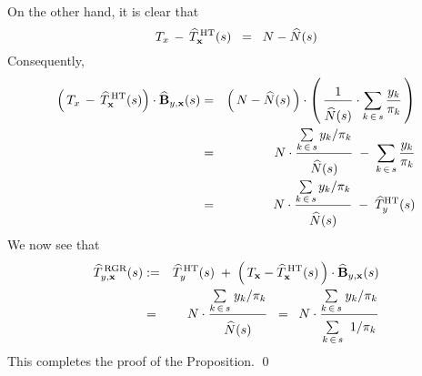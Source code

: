 On the other hand, it is clear that
\begin{equation*}
T_{x} \,-\, \widehat{T}^{\,\textnormal{HT}}_{\mathbf{x}}(s) \;\; = \;\; N - \widehat{N}(s)
\end{equation*}
Consequently,
\begin{eqnarray*}
\left(\,T_{x} \,-\, \widehat{T}^{\,\textnormal{HT}}_{\mathbf{x}}(s)\right)
\cdot
\widehat{\mathbf{B}}_{y,\mathbf{x}}(s)
& = &
	\left(\,N - \widehat{N}(s) \,\right)
	\cdot
	\left(\,
		\dfrac{1}{\overset{{\color{white}.}}{\widehat{N}(s)}}
		\cdot
		\underset{k\,\in\,s}{\sum}\, \dfrac{y_{k}}{\pi_{k}}
	\,\right)
\\
& = &
	N \cdot \dfrac{ \underset{k\,\in\,s}{\sum}\, y_{k}/\pi_{k} }{\overset{{\color{white}.}}{\widehat{N}(s)}}
	\; - \;
	\underset{k\,\in\,s}{\sum}\, \dfrac{y_{k}}{\pi_{k}}
\\
& = &
	N \cdot \dfrac{ \underset{k\,\in\,s}{\sum}\, y_{k}/\pi_{k} }{\overset{{\color{white}.}}{\widehat{N}(s)}}
	\; - \;
	\widehat{T}^{\textnormal{HT}}_{y}(s)
\end{eqnarray*}
We now see that
\begin{eqnarray*}
\widehat{T}^{\,\textnormal{RGR}}_{y,\mathbf{x}}(s)
& := &
	\widehat{T}^{\,\textnormal{HT}}_{y}(s)
	\; + \;
	\left(\,T_{\mathbf{x}} - \widehat{T}^{\,\textnormal{HT}}_{\mathbf{x}}(s) \,\right)
	\cdot
	\widehat{\mathbf{B}}_{y,\mathbf{x}}(s)
\\
& = &
	N \cdot
	\dfrac{
		\underset{k\,\in\,s}{\sum}\;y_{k}/\pi_{k}
		}{
		\overset{{\color{white}.}}{\widehat{N}(s)}
		}
\;\; = \;\;
	N \cdot
	\dfrac{
		\underset{k\,\in\,s}{\sum}\;y_{k}/\pi_{k}
		}{
		\underset{k\,\in\,s}{\overset{{\color{white}.}}{\sum}}\;\;1/\pi_{k}
		}
\end{eqnarray*}
This completes the proof of the Proposition.
\qed


\renewcommand{\theenumi}{\roman{enumi}}
\renewcommand{\labelenumi}{\textnormal{(\theenumi)}$\;\;$}

